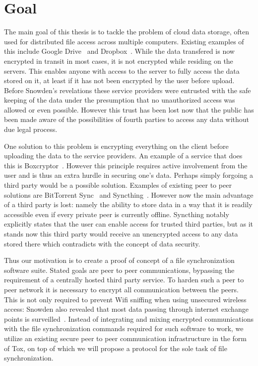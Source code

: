 \section{Goal}
\label{sec:Goal}

The main goal of this thesis is to tackle the problem of cloud data storage, often used for distributed file access across multiple computers.
Existing examples of this include Google Drive~\cite{web:site:gdrive} and Dropbox~\cite{web:site:dropbox}.
While the data transfered is now encrypted in transit in most cases, it is not encrypted while residing on the servers.
This enables anyone with access to the server to fully access the data stored on it, at least if it has not been encrypted by the user before upload.
Before Snowden's revelations these service providers were entrusted with the safe keeping of the data under the presumption that no unauthorized access was allowed or even possible.
However this trust has been lost now that the public has been made aware of the possibilities of fourth parties to access any data without due legal process.

One solution to this problem is encrypting everything on the client before uploading the data to the service providers.
An example of a service that does this is Boxcryptor~\cite{web:site:boxcryptor}.
However this principle requires active involvement from the user and is thus an extra hurdle in securing one's data.
Perhaps simply forgoing a third party would be a possible solution.
Examples of existing peer to peer solutions are BitTorrent Sync~\cite{web:site:bittorrent_sync} and Syncthing~\cite{web:site:synthing}.
However now the main advantage of a third party is lost: namely the ability to store data in a way that it is readily accessible even if every private peer is currently offline.
Syncthing notably explicitly states that the user can enable access for trusted third parties, but as it stands now this third party would receive an unencrypted access to any data stored there which contradicts with the concept of data security.

Thus our motivation is to create a proof of concept of a file synchronization software suite.
Stated goals are peer to peer communications, bypassing the requirement of a centrally hosted third party service.
To harden such a peer to peer network it is necessary to encrypt all communication between the peers.
This is not only required to prevent Wifi sniffing when using unsecured wireless access: Snowden also revealed that most data passing through internet exchange points is surveilled~\cite{web:site:heise:decix}.
Instead of integrating and mixing encrypted communications with the file synchronization commands required for such software to work, we utilize an existing secure peer to peer communication infrastructure in the form of Tox, on top of which we will propose a protocol for the sole task of file synchronization.


